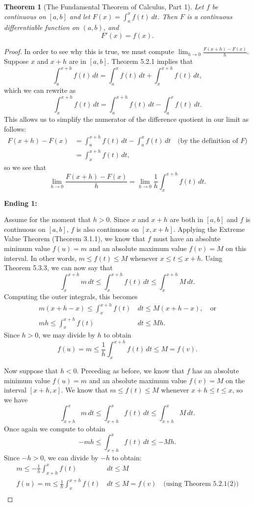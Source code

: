 \documentclass{amsart}\nofiles
\newtheorem{theorem}{Theorem}
\begin{document}
\begin{theorem}[The Fundamental Theorem of Calculus, Part 1]
Let $f$ be continuous on $[a,b]$ and let $F(x) = \int_a^x f(t)\ dt$. Then $F$ is a continuous differentiable function on $(a,b)$, and
\[F'(x)=f(x).\]
\end{theorem}

\begin{proof}
In order to see why this is true, we must compute $\displaystyle\lim_{h\to 0}\frac{F(x+h)-F(x)}{h}$. Suppose $x$ and $x+h$ are in $[a,b]$. Theorem 5.2.1 implies that
\[\int_a^{x+h}f(t)\,dt =\int_a^x f(t)\,dt+\int_x^{x+h} f(t)\,dt,\]
which we can rewrite as
\[\int_x^{x+h} f(t)\,dt=\int_a^{x+h} f(t)\,dt-\int_a^x f(t)\,dt.\]
This allows us to simplify the numerator of the difference quotient in our limit as follows:
\begin{align*}
F(x+h)-F(x)
&=\int_a^{x+h} f(t)\,dt-\int_a^x f(t)\,dt \quad\text{(by the definition of $F$)}\\
&=\int_x^{x+h} f(t)\,dt,
\end{align*}
so we see that
\[\lim_{h\to 0}\frac{F(x+h)-F(x)}{h}=\lim_{h\to 0}\frac 1h\int_x^{x+h} f(t)\,dt.\]

\textbf{Ending 1:}

Assume for the moment that $h>0$. Since $x$ and $x+h$ are both in $[a,b]$ and $f$ is continuous on $[a,b]$, $f$ is also continuous on $[x,x+h]$. Applying the Extreme Value Theorem (Theorem 3.1.1), we know that $f$ must have an absolute minimum value $f(u)=m$ and an absolute maximum value $f(v)=M$ on this interval. In other words, $m\leq f(t)\leq M$ whenever $x\leq t\leq x+h$. Using Theorem 5.3.3,
we can now say that
\[\int_x^{x+h} m\,dt \leq \int_x^{x+h} f(t)\,dt \leq \int_x^{x+h} M\,dt.\]
Computing the outer integrals, this becomes 
\begin{align*}
m(x+h-x)\leq \int_x^{x+h} f(t)&\,dt \leq M(x+h-x),\quad\text{or}\\
mh\leq \int_x^{x+h} f(t)&\,dt \leq Mh.
\end{align*}
Since $h>0$, we may divide by $h$ to obtain
\[f(u)=m\leq \frac1h\int_x^{x+h} f(t)\,dt \leq M=f(v).\]

Now suppose that $h<0$. Preceding as before, we know that $f$ has an absolute minimum value $f(u)=m$ and an absolute maximum value $f(v)=M$ on the interval $[x+h,x]$. We know that $m\leq f(t)\leq M$ whenever $x+h\leq t\leq x$, so we have \[\int_{x+h}^x m\,dt\leq\int_{x+h}^x f(t)\,dt\leq \int_{x+h}^x M\,dt.\] Once again we compute to obtain \[ -mh\leq \int_{x+h}^x f(t)\,dt \leq -Mh.\]
Since $-h>0$, we can divide by $-h$ to obtain:
\begin{align*}
m\leq -\frac1h\int_{x+h}^x f(t)&\,dt \leq M\\
f(u)=m\leq \frac1h \int_x^{x+h} f(t)&\,dt \leq M=f(v)
\quad\text{(using Theorem 5.2.1(2))}\\
\end{align*}


\end{proof}
\end{document}
